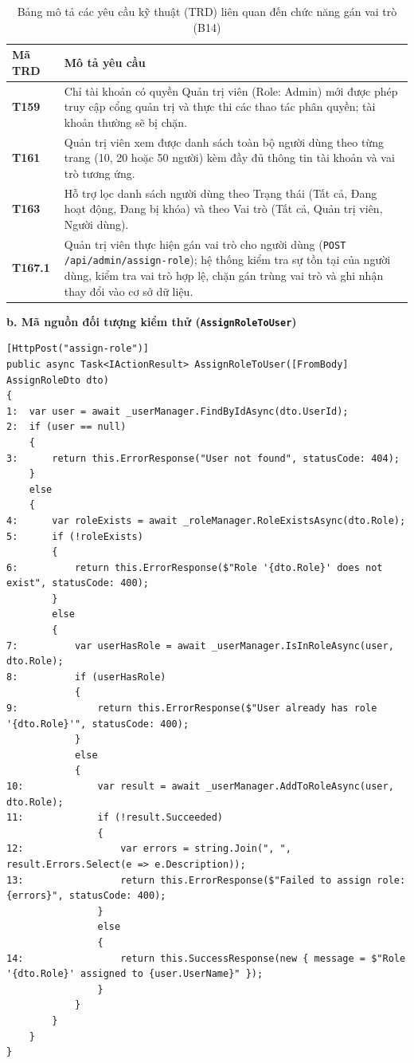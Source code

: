\documentclass[11pt,a4paper]{article}
\begin{document}
\begin{table}[H]
\centering
\small
\begin{tabularx}{\textwidth}{|C{1.8cm}|X|}
\hline
{}
\textbf{Mã TRD} & \textbf{Mô tả yêu cầu} \tabularnewline
\hline
\textbf{T159} & Chỉ tài khoản có quyền Quản trị viên (Role: Admin) mới được phép truy cập cổng quản trị và thực thi các thao tác phân quyền; tài khoản thường sẽ bị chặn. \\ \hline
\textbf{T161} & Quản trị viên xem được danh sách toàn bộ người dùng theo từng trang (10, 20 hoặc 50 người) kèm đầy đủ thông tin tài khoản và vai trò tương ứng. \\ \hline
\textbf{T163} & Hỗ trợ lọc danh sách người dùng theo Trạng thái (Tất cả, Đang hoạt động, Đang bị khóa) và theo Vai trò (Tất cả, Quản trị viên, Người dùng). \\ \hline
\textbf{T167.1} & Quản trị viên thực hiện gán vai trò cho người dùng (\texttt{POST /api/admin/assign-role}); hệ thống kiểm tra sự tồn tại của người dùng, kiểm tra vai trò hợp lệ, chặn gán trùng vai trò và ghi nhận thay đổi vào cơ sở dữ liệu. \\ \hline
\end{tabularx}
\caption{Bảng mô tả các yêu cầu kỹ thuật (TRD) liên quan đến chức năng gán vai trò (B14)}
\end{table}

\noindent\textbf{b. Mã nguồn đối tượng kiểm thử (\texttt{AssignRoleToUser})}
\begin{lstlisting}[language={[Sharp]C}]
[HttpPost("assign-role")]
public async Task<IActionResult> AssignRoleToUser([FromBody] AssignRoleDto dto)
{
1:  var user = await _userManager.FindByIdAsync(dto.UserId);
2:  if (user == null)
    {
3:      return this.ErrorResponse("User not found", statusCode: 404);
    }
    else
    {
4:      var roleExists = await _roleManager.RoleExistsAsync(dto.Role);
5:      if (!roleExists)
        {
6:          return this.ErrorResponse($"Role '{dto.Role}' does not exist", statusCode: 400);
        }
        else
        {
7:          var userHasRole = await _userManager.IsInRoleAsync(user, dto.Role);
8:          if (userHasRole)
            {
9:              return this.ErrorResponse($"User already has role '{dto.Role}'", statusCode: 400);
            }
            else
            {
10:             var result = await _userManager.AddToRoleAsync(user, dto.Role);
11:             if (!result.Succeeded)
                {
12:                 var errors = string.Join(", ", result.Errors.Select(e => e.Description));
13:                 return this.ErrorResponse($"Failed to assign role: {errors}", statusCode: 400);
                }
                else
                {
14:                 return this.SuccessResponse(new { message = $"Role '{dto.Role}' assigned to {user.UserName}" });
                }
            }
        }
    }
}
\end{lstlisting}
\end{document}
